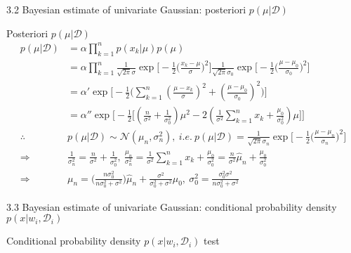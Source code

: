 \documentclass[compress,blue]{beamer}
\newcommand{\calD}{\mathcal{D}}
\begin{document}
\begin{frame}{3.2 Bayesian estimate of univariate Gaussian: posteriori $p(\mu|\calD)$}
	\begin{block}{Posteriori $p(\mu|\calD)$}
		\vspace{-0.15in}
		\tiny
		\begin{align}
			p(\mu|\calD) &= \alpha \prod_{k=1}^n p(x_k | \mu)p(\mu)\\
			&= \alpha \prod_{k=1}^n \frac{1}{\sqrt{2\pi}\sigma}\exp\Big[-\frac{1}{2}\Big(\frac{x_k-\mu}{\sigma}\Big)^2\Big]\frac{1}{\sqrt{2\pi}\sigma_0}\exp\Big[-\frac{1}{2}\Big(\frac{\mu-\mu_0}{\sigma_0}\Big)^2\Big]\\
			&=\alpha' \exp\Big[-\frac{1}{2}\Big(\sum_{k=1}^n(\frac{\mu-x_k}{\sigma})^2 + (\frac{\mu-\mu_0}{\sigma_0})^2\Big)\Big]\\
			&=\alpha'' \exp\Big[-\frac{1}{2}\Big[(\frac{n}{\sigma^2} + \frac{1}{\sigma_0^2})\mu^2 - 2(\frac{1}{\sigma^2}\sum_{k=1}^n x_k + \frac{\mu_0}{\sigma_0^2})\mu\Big]\Big] \\
		 	\therefore ~~& p(\mu | \calD) \sim \mathcal{N}(\mu_n, \sigma_n^2), ~i.e.~ p(\mu|\calD) = \frac{1}{\sqrt{2\pi}\sigma_n} \exp\Big[-\frac{1}{2}\Big(\frac{\mu-\mu_n}{\sigma_n}\Big)^2\Big]\\
			\Longrightarrow &\frac{1}{\sigma^2_n} = \frac{n}{\sigma^2} + \frac{1}{\sigma^2_0}, ~ \frac{\mu_n}{\sigma^2_n} = \frac{1}{\sigma^2}\sum_{k=1}^n x_k + \frac{\mu_0}{\sigma^2_0} = \frac{n}{\sigma^2}\hat{\mu}_n + \frac{\mu_0}{\sigma^2_0}\\
			\Longrightarrow & \mu_n = \Big(\frac{n\sigma^2_0}{n\sigma^2_0 + \sigma^2}\Big)\hat{\mu}_n + \frac{\sigma^2}{\sigma^2_0+\sigma^2}\mu_0, ~ \sigma_0^2 = \frac{\sigma_0^2\sigma^2}{n\sigma^2_0 + \sigma^2}
		\end{align}
		\normalsize
	\end{block}
\end{frame}

\begin{frame}{3.3 Bayesian estimate of univariate Gaussian: conditional probability density $p(x | w_i, \calD_i)$}
	\begin{block}{Conditional probability density $p(x | w_i, \calD_i)$}
		test
	\end{block}
\end{frame}
\end{document}
